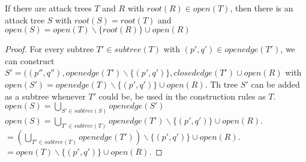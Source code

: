 \begin{lemma}
  \label{lemma:tree-composition}
  If there are attack trees $T$ and $R$ with
  $root(R) ∈ open(T)$,
  then there is an attack tree $S$ with
  $root(S) = root(T)$ and
  $open(S) = open(T) ∖ \{root(R)\} ∪ open(R)$
\end{lemma}
\begin{proof}
  For every subtree $T' ∈ subtree(T)$
  with $(p',q') ∈ openedge(T')$, we can construct
  $S' = ((p'',q''), openedge(T') ∖ \{(p',q')\}, closededge(T') ∪ open(R)$ with
  $open(S') = openedge(T) ∖ \{(p',q')\} ∪ open(R)$.
  Th tree $S'$ can be added as a subtree whenever $T'$ could be,
  be used in the construction rules as $T$.
  $open(S) = ⋃_{S' ∈ subtree(S)} openedge(S')$
  $open(S) = ⋃_{T' ∈ subtree(T)} openedge(T') ∖ \{(p',q')\} ∪ open(R)$.
  $= (⋃_{T' ∈ subtree(T)} openedge(T')) ∖ \{(p',q')\} ∪ open(R)$.
  $= open(T) ∖ \{(p',q')\} ∪ open(R)$.
\end{proof}
